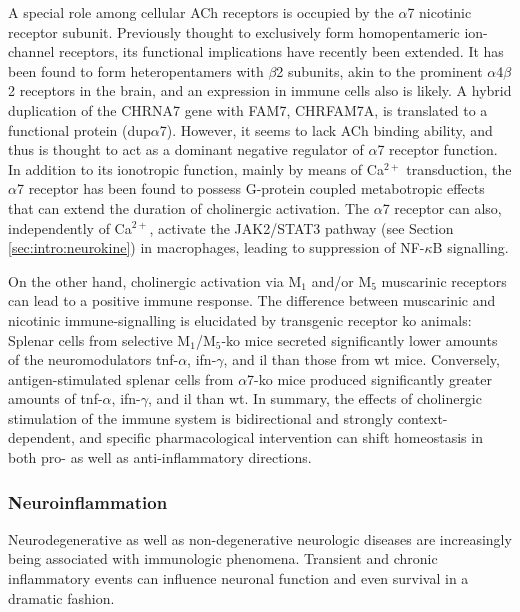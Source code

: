 A special role among cellular ACh receptors is occupied by the $\alpha$7 nicotinic receptor subunit. Previously thought to exclusively form homopentameric ion-channel receptors, its functional implications have recently been extended. It has been found to form heteropentamers with $\beta$2 subunits, akin to the prominent $\alpha$4$\beta$2 receptors in the brain, and an expression in immune cells also is likely. A hybrid duplication of the CHRNA7 gene with FAM7, CHRFAM7A, is translated to a functional protein (dup$\alpha$7). However, it seems to lack ACh binding ability, and thus is thought to act as a dominant negative regulator of $\alpha$7 receptor function. In addition to its ionotropic function, mainly by means of Ca$^{2+}$ transduction, the $\alpha$7 receptor has been found to possess G-protein coupled metabotropic effects that can extend the duration of cholinergic activation. The $\alpha$7 receptor can also, independently of Ca$^{2+}$, activate the JAK2/STAT3 pathway (see Section \ref{sec:intro:neurokine}) in macrophages, leading to suppression of NF-$\kappa$B signalling.

On the other hand, cholinergic activation via M$_1$ and/or M$_5$ muscarinic receptors can lead to a positive immune response. The difference between muscarinic and nicotinic immune-signalling is elucidated by transgenic receptor \ac{ko} animals: Splenar cells from selective M$_1$/M$_5$-\ac{ko} mice secreted significantly lower amounts of the neuromodulators \ac{tnf}-$\alpha$, \ac{ifn}-$\gamma$, and \ac{il} than those from \ac{wt} mice. Conversely, antigen-stimulated splenar cells from $\alpha$7-\ac{ko} mice produced significantly greater amounts of \ac{tnf}-$\alpha$, \ac{ifn}-$\gamma$, and \ac{il} than \ac{wt}. In summary, the effects of cholinergic stimulation of the immune system is bidirectional and strongly context-dependent, and specific pharmacological intervention can shift homeostasis in both pro- as well as anti-inflammatory directions.

\subsubsection{Neuroinflammation}
Neurodegenerative as well as non-degenerative neurologic diseases are increasingly being associated with immunologic phenomena. Transient and chronic inflammatory events can influence neuronal function and even survival in a dramatic fashion.


